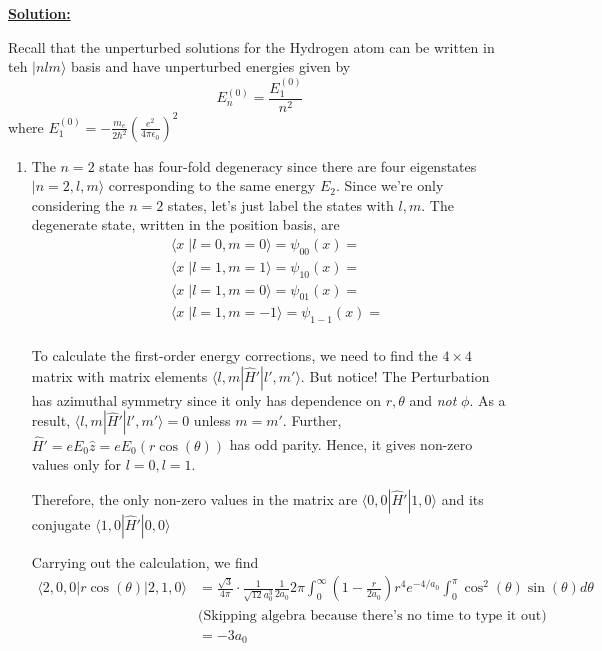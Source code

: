 \documentclass{article}
\newcommand{\ket}[1]{|#1 \rangle}
\newcommand{\inner}[2]{\langle #1 | #2 \rangle}
\begin{document}
\vskip 0.5cm
\underline{\textbf{Solution:}} 

\vskip 0.5cm
Recall that the unperturbed solutions for the Hydrogen atom can be written in teh $\ket{nlm}$ basis and have unperturbed energies given by 
\[ E_n^{(0)} = \frac{E_1^(0)}{n^2} \]
where $E_1^{(0)} = -\frac{m_e}{2\hbar^2} \left( \frac{e^2}{4\pi \epsilon_0}\right)^2$

\begin{enumerate}[label=(\alph*)]
  \item The $n=2$ state has four-fold degeneracy since there are four eigenstates $\ket{n = 2,l,m}$ corresponding to the same energy $E_2$. Since we're only considering the $n=2$ states, let's just label the states with $l,m$. The degenerate state, written in the position basis, are 
  \begin{align*} 
    &\inner{x \;}{l = 0, m = 0} = \psi_{00}(x) = \\
    &\inner{x \;}{l = 1, m = 1} = \psi_{10}(x) = \\
    &\inner{x \;}{l = 1, m = 0} = \psi_{01}(x) = \\
    &\inner{x \;}{l = 1, m = -1} = \psi_{1-1}(x) = \\
  \end{align*} 

  To calculate the first-order energy corrections, we need to find the $4 \times 4$ matrix with matrix elements $\inner{l,m}{\hat{H}'| l', m'}$. But notice! The Perturbation has azimuthal symmetry since it only has dependence on $r, \theta$ and \emph{not} $\phi$. As a result, $\inner{l,m}{\hat{H}'| l', m'} = 0$ unless $m = m'$. Further, $\hat{H}' = eE_0 \hat{z} = eE_0 (r\cos(\theta))$ has odd parity. Hence, it gives non-zero values only for $l = 0, l = 1$.
 
\vskip 0.5cm 
Therefore, the only non-zero values in the matrix are $\inner{0, 0}{\hat{H}'|1, 0}$ and its conjugate $\inner{1, 0}{\hat{H}'|0, 0}$

Carrying out the calculation, we find 
\begin{align*}
  \inner{2, 0, 0}{r\cos(\theta)|2, 1, 0} &= \frac{\sqrt{3}}{4\pi} \cdot \frac{1}{\sqrt{12}a_0^3} \frac{1}{2a_0}2\pi \int_{0}^{\infty} \left( 1 - \frac{r}{2a_0} \right) r^4 e^{-4/a_0} \int_{0}^{\pi} \cos^2(\theta) \sin(\theta) d\theta \\
  &\text{(Skipping algebra because there's no time to type it out)} \\
  &= -3a_0
\end{align*}


\end{enumerate}
\end{document}
